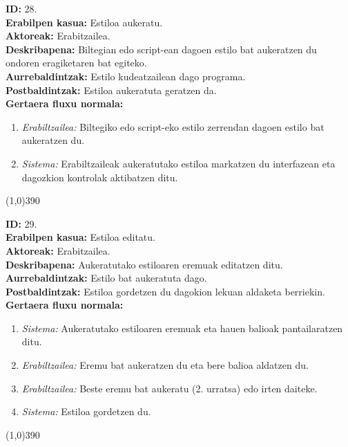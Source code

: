\noindent
\textbf{ID:} 28.\\
\textbf{Erabilpen kasua:} Estiloa aukeratu.\\
\textbf{Aktoreak:} Erabitzailea.\\
\textbf{Deskribapena:} Biltegian edo script-ean dagoen estilo bat aukeratzen du ondoren eragiketaren bat egiteko.\\
\textbf{Aurrebaldintzak:} Estilo kudeatzailean dago programa.\\
\textbf{Postbaldintzak:} Estiloa aukeratuta geratzen da.\\
\textbf{Gertaera fluxu normala:}
\begin{enumerate}
	\item \textit{Erabiltzailea:} Biltegiko edo script-eko estilo zerrendan dagoen estilo bat aukeratzen du.
	\item \textit{Sistema:} Erabiltzaileak aukeratutako estiloa markatzen du interfazean eta dagozkion kontrolak aktibatzen ditu.
\end{enumerate}
\line(1,0){390}

\noindent
\textbf{ID:} 29.\\
\textbf{Erabilpen kasua:} Estiloa editatu.\\
\textbf{Aktoreak:} Erabitzailea.\\
\textbf{Deskribapena:} Aukeratutako estiloaren eremuak editatzen ditu.\\
\textbf{Aurrebaldintzak:} Estilo bat aukeratuta dago.\\
\textbf{Postbaldintzak:} Estiloa gordetzen du dagokion lekuan aldaketa berriekin.\\
\textbf{Gertaera fluxu normala:}
\begin{enumerate}
	\item \textit{Sistema:} Aukeratutako estiloaren eremuak eta hauen balioak pantailaratzen ditu.
	\item \textit{Erabiltzailea:} Eremu bat aukeratzen du eta bere balioa aldatzen du.
	\item \textit{Erabiltzailea:} Beste eremu bat aukeratu (2. urratsa) edo irten daiteke.
	\item \textit{Sistema:} Estiloa gordetzen du.
\end{enumerate}
\line(1,0){390}

